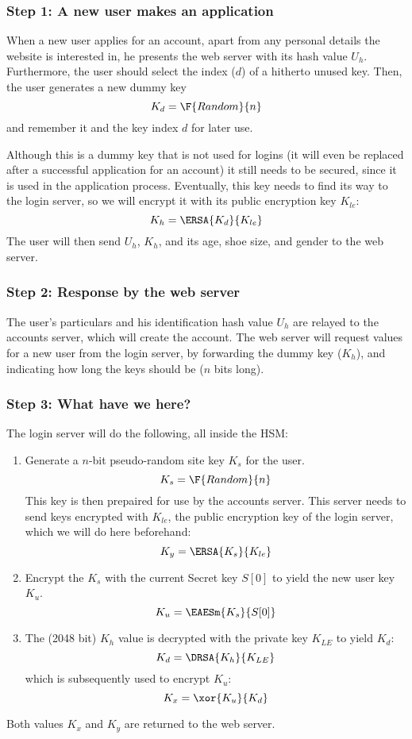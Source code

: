 \label{sec:applying}
\subsubsection{Step 1: A new user makes an application}
\label{sec:apply_step1}
When a new user applies for an account,
apart from any personal details the website is interested in,
he presents the web server with its hash value $U_h$.
Furthermore,
the user should select the index ($d$) of a hitherto unused key.
Then, the user generates a new dummy key
\[K_d=\F{Random}{n}\]
and remember it and the key index $d$ for later use.
\par
Although this is a dummy key that is not used for logins
(it will even be replaced after a successful application for an account)
it still needs to be secured,
since it is used in the application process.
Eventually,
this key needs to find its way to the login server,
so we will encrypt it with its public encryption key $K_{le}$:
\[K_h=\ERSA{K_d}{K_{le}}\]
The user will then send $U_h$, $K_h$, and its age, shoe size, and gender to the web server.

\subsubsection{Step 2: Response by the web server}
\label{sec:apply_step2}
The user's particulars and his identification hash value $U_h$ are relayed to the accounts server,
which will create the account.
The web server will request values for a new user from the login server,
by forwarding the dummy key ($K_h$),
and indicating how long the keys should be
($n$ bits long).

\subsubsection{Step 3: What have we here?}
\label{sec:apply_step3}
The login server will do the following, all inside the HSM:
\begin{enumerate}
\item Generate a $n$-bit pseudo-random site key $K_s$ for the user.
\[K_s=\F{Random}{n}\]
This key is then prepaired for use by the accounts server.
This server needs to send keys encrypted with $K_{le}$, the public encryption key of the login server,
which we will do here beforehand:
\[K_y=\ERSA{K_s}{K_{le}}\]
\item Encrypt the $K_s$ with the current Secret key $S[0]$ to yield the new user key $K_u$.
\[K_u=\EAESm{K_s}{S[0]}\]
\item The (2048 bit) $K_h$ value is decrypted with the private key $K_{LE}$ to yield $K_d$:
\[K_d=\DRSA{K_h}{K_{LE}}\]
which is subsequently used to encrypt $K_u$:
\[K_x=\xor{K_u}{K_d}\]
\end{enumerate}
Both values $K_x$ and $K_y$ are returned to the web server.
